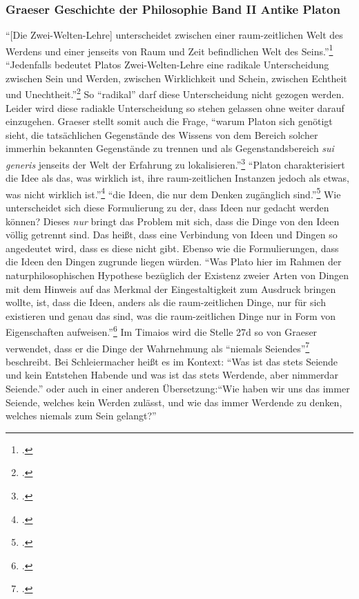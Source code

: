 \subsubsection*{Graeser Geschichte der Philosophie Band II Antike Platon}
\enquote{[Die Zwei-Welten-Lehre] unterscheidet zwischen einer raum-zeitlichen Welt des Werdens und einer jenseits von Raum und Zeit befindlichen Welt des Seins.}\footcite[][S. 133]{GraeserPhiloGeschichte}
\enquote{Jedenfalls bedeutet Platos Zwei-Welten-Lehre eine radikale Unterscheidung zwischen Sein und Werden, zwischen Wirklichkeit und Schein, zwischen Echtheit und Unechtheit.}\footcite[][S. 134]{GraeserPhiloGeschichte}
So \enquote{radikal} darf diese Unterscheidung nicht gezogen werden. Leider wird diese radiakle Unterscheidung so stehen gelassen ohne weiter darauf einzugehen.
Graeser stellt somit auch die Frage, \enquote{warum Platon sich genötigt sieht, die tatsächlichen Gegenstände des Wissens von dem Bereich solcher immerhin bekannten Gegenstände zu trennen und als Gegenstandsbereich \emph{sui generis} jenseits der Welt der Erfahrung zu lokalisieren.}\footcite[][S. 135]{GraeserPhiloGeschichte}
\enquote{Platon charakterisiert die Idee als das, was wirklich ist, ihre raum-zeitlichen Instanzen jedoch als etwas, was nicht wirklich ist.}\footcite[][S. 139]{GraeserPhiloGeschichte}
\enquote{die Ideen, die nur dem Denken zugänglich sind.}\footcite[][S. 139]{GraeserPhiloGeschichte} Wie unterscheidet sich diese Formulierung zu der, dass Ideen nur gedacht werden können? Dieses \emph{nur} bringt das Problem mit sich, dass die Dinge von den Ideen völlig getrennt sind. Das heißt, dass eine Verbindung von Ideen und Dingen so angedeutet wird, dass es diese nicht gibt. Ebenso wie die Formulierungen, dass die Ideen den Dingen zugrunde liegen würden. 
\enquote{Was Plato hier im Rahmen der naturphilosophischen Hypothese bezüglich der Existenz zweier Arten von Dingen mit dem Hinweis auf das Merkmal der Eingestaltigkeit zum Ausdruck bringen wollte, ist, dass die Ideen, anders als die raum-zeitlichen Dinge, nur für sich existieren und genau das sind, was die raum-zeitlichen Dinge nur in Form von Eigenschaften aufweisen.}\footcite[][S. 140]{GraeserPhiloGeschichte}
Im Timaios wird die Stelle 27d so von Graeser verwendet, dass er die Dinge der Wahrnehmung als \enquote{niemals Seiendes}\footcite[vgl.][S. 140]{GraeserPhiloGeschichte} beschreibt. Bei Schleiermacher heißt es im Kontext: \enquote{Was ist das stets Seiende und kein Entstehen Habende und was ist das stets Werdende, aber nimmerdar Seiende.} oder auch in einer anderen Übersetzung:\enquote{Wie haben wir uns das immer Seiende, welches kein Werden zulässt, und wie das immer Werdende zu denken, welches niemals zum Sein gelangt?}
